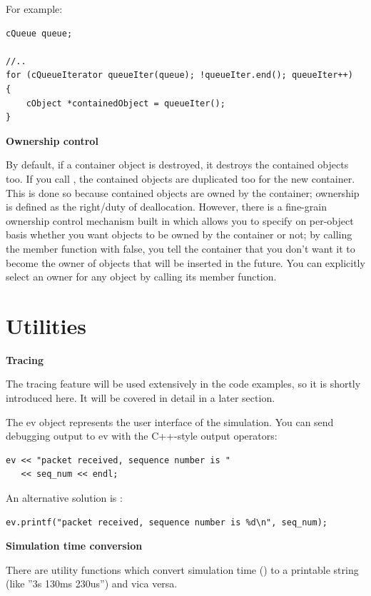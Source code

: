 For example:

\begin{Verbatim}
cQueue queue;

//..
for (cQueueIterator queueIter(queue); !queueIter.end(); queueIter++)
{
    cObject *containedObject = queueIter();
}
\end{Verbatim}


\textbf{Ownership control}


By default, if a container object is destroyed, it destroys the
contained objects too. If you call , the contained
objects are duplicated too for the new container. This is done so
because contained objects are owned by the container; ownership is
defined as the right/duty of deallocation. However, there is a
fine-grain ownership control mechanism built
in which allows you to specify on per-object basis whether you want
objects to be owned by the container or not; by calling the
 member function with false, you tell the
container that you don't want it to become the owner of objects that
will be inserted in the future.  You can explicitly select an owner
for any object by calling its  member function.



\section{Utilities}

\textbf{Tracing}


The tracing feature will be used extensively in the code examples, 
so it is shortly introduced here. It will be covered in detail 
in a later section.

The ev object represents the user interface of the
simulation.  You can send debugging output to ev with the C++-style
output operators:

\begin{Verbatim}
ev << "packet received, sequence number is "
   << seq_num << endl;
\end{Verbatim}

An alternative solution is :

\begin{Verbatim}
ev.printf("packet received, sequence number is %d\n", seq_num);
\end{Verbatim}

\textbf{Simulation time conversion}


There are utility functions which convert simulation
time () to a printable string
(like ''3s 130ms 230us'') and vica versa.


